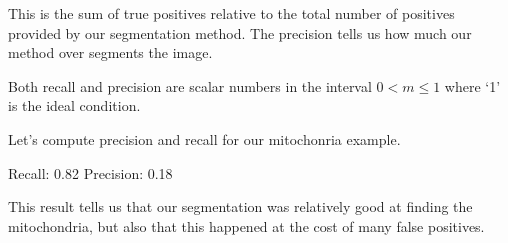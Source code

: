 \documentclass[letterpaper,10pt,english]{sphinxmanual}
\begin{document}
\sphinxAtStartPar
This is the sum of true positives relative to the total number of positives provided by our segmentation method. The precision tells us how much our method over segments the image.

\sphinxAtStartPar
Both recall and precision are scalar numbers in the interval \(0<m\leq1\) where ‘1’ is the ideal condition.

\sphinxAtStartPar
Let’s compute precision and recall for our mitochonria example.

\begin{sphinxVerbatim}[commandchars=\\\{\}]
\PYG{p}{[}\PYG{p}{]} 
                         \PYG{p}{[}\PYG{p}{]}\PYG{p}{[}\PYG{p}{]}
\PYG{p}{[}\PYG{p}{]} 
                            \PYG{p}{[}\PYG{p}{]}\PYG{p}{[}\PYG{p}{]}
\end{sphinxVerbatim}

\begin{sphinxVerbatim}[commandchars=\\\{\}]
Recall: 0.82
Precision: 0.18
\end{sphinxVerbatim}

\sphinxAtStartPar
This result tells us that our segmentation was relatively good at finding the mitochondria, but also that this happened at the cost of many false positives.
\end{document}
